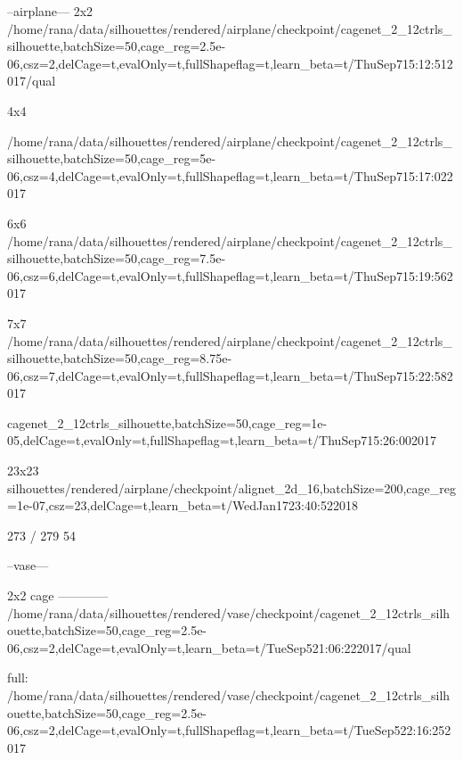 \documentclass[acmtog,timestamp]{acmart}%
\newcommand{\jsubfig}[2]{%
	\sbox\jsavebox{#1}%
	\parbox[t]{\wd\jsavebox}{\centering\usebox\jsavebox\\#2}%
	}
\begin{document}
\begin{comment}
    \jsubfig{\texttt{[image: \{figures/ablation/acc.png]}}}{}%
	\hfill \jsubfig{\texttt{[image: figures/ablation/sm.png]}}{}
   
   
    
    
    
\end{comment}%


--airplane---
2x2
/home/rana/data/silhouettes/rendered/airplane/checkpoint/cagenet_2_12ctrls_silhouette,batchSize=50,cage_reg=2.5e-06,csz=2,delCage=t,evalOnly=t,fullShapeflag=t,learn_beta=t/ThuSep715:12:512017/qual

4x4

/home/rana/data/silhouettes/rendered/airplane/checkpoint/cagenet_2_12ctrls_silhouette,batchSize=50,cage_reg=5e-06,csz=4,delCage=t,evalOnly=t,fullShapeflag=t,learn_beta=t/ThuSep715:17:022017

6x6
/home/rana/data/silhouettes/rendered/airplane/checkpoint/cagenet_2_12ctrls_silhouette,batchSize=50,cage_reg=7.5e-06,csz=6,delCage=t,evalOnly=t,fullShapeflag=t,learn_beta=t/ThuSep715:19:562017

7x7
/home/rana/data/silhouettes/rendered/airplane/checkpoint/cagenet_2_12ctrls_silhouette,batchSize=50,cage_reg=8.75e-06,csz=7,delCage=t,evalOnly=t,fullShapeflag=t,learn_beta=t/ThuSep715:22:582017


cagenet_2_12ctrls_silhouette,batchSize=50,cage_reg=1e-05,delCage=t,evalOnly=t,fullShapeflag=t,learn_beta=t/ThuSep715:26:002017

23x23
silhouettes/rendered/airplane/checkpoint/alignet_2d_16,batchSize=200,cage_reg=1e-07,csz=23,delCage=t,learn_beta=t/WedJan1723:40:522018



273 / 279
54

--vase---

2x2 cage
------------
/home/rana/data/silhouettes/rendered/vase/checkpoint/cagenet_2_12ctrls_silhouette,batchSize=50,cage_reg=2.5e-06,csz=2,delCage=t,evalOnly=t,learn_beta=t/TueSep521:06:222017/qual

full:
/home/rana/data/silhouettes/rendered/vase/checkpoint/cagenet_2_12ctrls_silhouette,batchSize=50,cage_reg=2.5e-06,csz=2,delCage=t,evalOnly=t,fullShapeflag=t,learn_beta=t/TueSep522:16:252017
\end{document}
